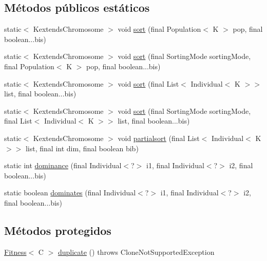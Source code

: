 \subsection*{Métodos públicos estáticos}
\begin{DoxyCompactItemize}
\item 
static$<$ Kextends\-Chromosome $>$ void \hyperlink{classjenes_1_1population_1_1_fitness_3_01_c_01extends_01_chromosome_01_4_a2601adaae23ba51f4f078b2e47bac2bf}{sort} (final Population$<$ K $>$ pop, final boolean...\-bis)
\item 
static$<$ Kextends\-Chromosome $>$ void \hyperlink{classjenes_1_1population_1_1_fitness_3_01_c_01extends_01_chromosome_01_4_a814eb910523f378522273a3fdd0cf1a6}{sort} (final Sorting\-Mode sorting\-Mode, final Population$<$ K $>$ pop, final boolean...\-bis)
\item 
static$<$ Kextends\-Chromosome $>$ void \hyperlink{classjenes_1_1population_1_1_fitness_3_01_c_01extends_01_chromosome_01_4_a160b6471e47adc4386c1dd4122a50e25}{sort} (final List$<$ Individual$<$ K $>$$>$ list, final boolean...\-bis)
\item 
static$<$ Kextends\-Chromosome $>$ void \hyperlink{classjenes_1_1population_1_1_fitness_3_01_c_01extends_01_chromosome_01_4_a351dc03eea62cdfb46b5dfe8e75b34cd}{sort} (final Sorting\-Mode sorting\-Mode, final List$<$ Individual$<$ K $>$$>$ list, final boolean...\-bis)
\item 
static$<$ Kextends\-Chromosome $>$ void \hyperlink{classjenes_1_1population_1_1_fitness_3_01_c_01extends_01_chromosome_01_4_abb440f362a2cd5578c25d2d8dd09a33f}{partialsort} (final List$<$ Individual$<$ K $>$$>$ list, final int dim, final boolean bib)
\item 
static int \hyperlink{classjenes_1_1population_1_1_fitness_3_01_c_01extends_01_chromosome_01_4_a40ee2060c7904075c6606c73f169e7b8}{dominance} (final Individual$<$?$>$ i1, final Individual$<$?$>$ i2, final boolean...\-bis)
\item 
static boolean \hyperlink{classjenes_1_1population_1_1_fitness_3_01_c_01extends_01_chromosome_01_4_a86b15569d72a9b78c7324ee344ef3dcd}{dominates} (final Individual$<$?$>$ i1, final Individual$<$?$>$ i2, final boolean...\-bis)
\end{DoxyCompactItemize}
\subsection*{Métodos protegidos}
\begin{DoxyCompactItemize}
\item 
\hyperlink{classjenes_1_1population_1_1_fitness_3_01_c_01extends_01_chromosome_01_4_aba60bd43d62c74ca35946ce9c75bff8f}{Fitness}$<$ C $>$ \hyperlink{classjenes_1_1population_1_1_fitness_3_01_c_01extends_01_chromosome_01_4_acea9db9e50fbde7132dc1de0c3baa641}{duplicate} ()  throws Clone\-Not\-Supported\-Exception 
\end{DoxyCompactItemize}


